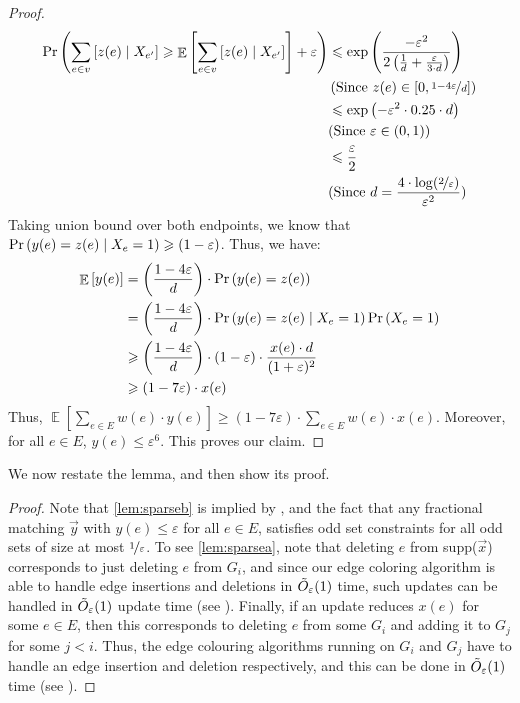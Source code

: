 \documentclass[a4paper,11pt]{article}
\DeclareMathOperator*{\Exp}{\ensuremath{{\mathbb{E}}}}
\DeclareMathOperator*{\Prob}{\ensuremath{\textnormal{Pr}}}
\renewcommand{\Pr}{\Prob}
\newcommand{\prob}[1]{\Pr\paren{#1}}
\newcommand{\paren}[1]{\left ( #1 \right )}
\newcommand{\bracket}[1]{\left [ #1 \right ]}
\newcommand{\expect}[1]{\Exp\bracket{#1}}
\newcommand{\eps}{\varepsilon}
\theoremstyle{definition}
\theoremstyle{definition}
\theoremstyle{definition}
\theoremstyle{definition}
\theoremstyle{definition}
\theoremstyle{definition}
\theoremstyle{definition}
\theoremstyle{definition}
\theoremstyle{definition}
\theoremstyle{definition}
\theoremstyle{definition}
\theoremstyle{definition}
\theoremstyle{definition}
\theoremstyle{definition}
\theoremstyle{definition}
\begin{document}
\begin{proof}
\begin{align*}
\prob{\sum_{e\in v}\bracket{z(e)\mid X_{e'}}\geqslant \expect{\sum_{e\in v}\bracket{z(e)\mid X_{e'}}}+\eps}&\leqslant \exp\paren{\frac{-\eps^2}{2\paren{\frac{1}{d}+\frac{\eps}{3\cdot d}}}}\\
&\paren{\text{Since }z(e)\in \bracket{0,\nicefrac{1-4\eps}{d}}}\\
&\leqslant \exp\paren{-\eps^2\cdot 0.25\cdot d}\\
&\text{(Since }\eps\in (0,1))\\
&\leqslant \frac{\eps}{2}\\
&\text{(Since }d=\frac{4\cdot \log(\nicefrac{2}{\eps})}{\eps^2})
\end{align*}
Taking union bound over both endpoints, we know that $\prob{y(e)=z(e)\mid X_e=1}\geqslant (1-\eps)$. Thus, we have:
\begin{align*}
\expect{y(e)}&=\paren{\frac{1-4\eps}{d}}\cdot \prob{y(e)=z(e)}\\
					&=\paren{\frac{1-4\eps}{d}}\cdot \prob{y(e)=z(e)\mid X_e=1}\prob{X_e=1}\\
					&\geqslant \paren{\frac{1-4\eps}{d}}\cdot (1-\eps)\cdot \frac{x(e)\cdot d}{(1+\eps)^2}\\
					&\geqslant (1-7\eps)\cdot x(e)
\end{align*}
Thus, $\expect{\sum_{e\in E}w(e)\cdot y(e)}\geqslant (1-7\eps)\cdot \sum_{e\in E}w(e)\cdot x(e)$. Moreover, for all $e\in E$, $y(e)\leqslant \eps^6$. This proves our claim. 
\end{proof}

We now restate the lemma, and then show its proof. 

\lemuno*
\begin{proof}
Note that \ref{lem:sparseb} is implied by , and the fact that any fractional matching $\vec{y}$ with $y(e)\leqslant \eps$ for all $e\in E$, satisfies odd set constraints for all odd sets of size at most $\nicefrac{1}{\eps}$. To see \ref{lem:sparsea}, note that deleting $e$ from supp($\vec{x}$) corresponds to just deleting $e$ from $G_i$, and since our edge coloring algorithm is able to handle edge insertions and deletions in $\Tilde{O}_{\eps}(1)$ time, such updates can be handled in $\Tilde{O}_{\eps}(1)$ update time (see ). Finally, if an update reduces $x(e)$ for some $e\in E$, then this corresponds to deleting $e$ from some $G_i$ and adding it to $G_j$ for some $j<i$. Thus, the edge colouring algorithms running on $G_i$ and $G_j$ have to handle an edge insertion and deletion respectively, and this can be done in $\Tilde{O}_{\eps}(1)$ time (see ). 
\end{proof}


\newpage


\end{document}
